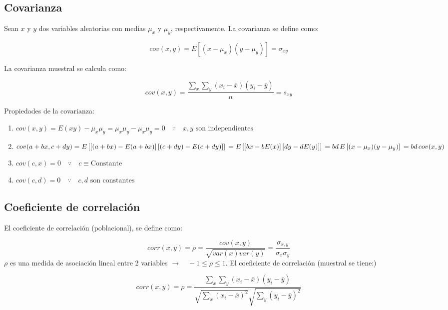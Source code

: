 \documentclass[
]{book}
\providecommand{\tightlist}{%
  \setlength{\itemsep}{0pt}\setlength{\parskip}{0pt}}
\begin{document}
\hypertarget{covarianza}{%
\subsection{Covarianza}\label{covarianza}}

Sean \(x\) y \(y\) dos variables aleatorias con medias \(\mu_x\) y \(\mu_y\), respectivamente. La covarianza se define como:

\[
cov(x,y) = E[(x-\mu_x)(y-\mu_y)] = \sigma_{xy}
\]

La covarianza muestral se calcula como:

\[
cov(x,y) = \frac{\sum_x \sum_y (x_i - \bar x)(y_i - \bar y)}{n} = s_{xy}
\]

Propiedades de la covarianza:

\begin{enumerate}
\def\labelenumi{\arabic{enumi}.}
\tightlist
\item
  \(cov(x,y) = E(xy) - \mu_x \mu_y = \mu_x \mu_y - \mu_x \mu_y = 0 \quad \because \quad x,y \text{ son independientes}\)
\item
  \(cov(a+bx, c+dy) = E\left[ \left[(a+bx) - E(a+bx)\right]\left[(c+dy) - E(c+dy)\right] \right] \\ = E\left[ \left[ bx - bE(x) \right]\left[ dy - dE(y) \right] \right] \\ = bd \, E\left[(x-\mu_{x})(y-\mu_{y})\right] \\ = bd \, cov(x, y)\)
\item
  \(cov(c,x) = 0 \quad \because \quad c \equiv \text{Constante}\)
\item
  \(cov(c,d) = 0 \quad \because \quad c,d \text{ son constantes}\)
\end{enumerate}

\hypertarget{coeficiente-de-correlaciuxf3n}{%
\subsection{Coeficiente de correlación}\label{coeficiente-de-correlaciuxf3n}}

El coeficiente de correlación (poblacional), se define como:

\[
corr(x,y) = \rho = \frac{cov(x,y)}{\sqrt{var(x)var(y)}} = \frac{\sigma_{x,y}}{\sigma_x \sigma_y}
\]
\(\rho\) es una medida de asociación lineal entre 2 variables \(\rightarrow \quad -1 \leq \rho \leq 1\).
El coeficiente de correlación (muestral se tiene:)

\[
corr(x,y) = \rho =  \frac{\sum_x \sum_y (x_i - \bar x)(y_i - \bar y)}{\sqrt{\sum_x (x_i - \bar x)^2} \sqrt{\sum_y(y_i - \bar y)^2}}
\]
\end{document}
